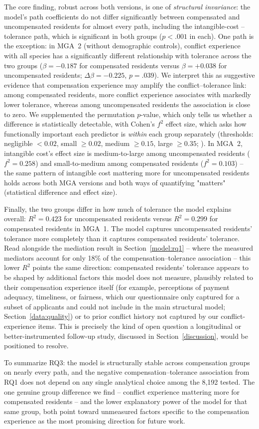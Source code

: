The core finding, robust across both versions, is one of \emph{structural
invariance}: the model's path coefficients do not differ significantly
between compensated and uncompensated residents for almost every path,
including the intangible-cost -- tolerance path, which is significant in both
groups ($p < .001$ in each). One path is the exception: in MGA~2 (without
demographic controls), conflict experience with all species has a
significantly different relationship with tolerance across the two groups
($\beta = -0.187$ for compensated residents versus $\beta = +0.038$ for
uncompensated residents; $\Delta\beta = -0.225$, $p = .039$). We interpret
this as suggestive evidence that compensation experience may amplify the
conflict--tolerance link: among compensated residents, more conflict
experience associates with markedly lower tolerance, whereas among
uncompensated residents the association is close to zero. We supplemented
the permutation $p$-value, which only tells us whether a difference is
statistically detectable, with Cohen's $f^2$ effect size, which asks how
functionally important each predictor is \emph{within} each group
separately (thresholds: negligible $< 0.02$, small $\geq 0.02$, medium
$\geq 0.15$, large $\geq 0.35$; \citealp{Cohen1988}). In MGA~2, intangible
cost's effect size is medium-to-large among uncompensated residents
($f^2 = 0.258$) and small-to-medium among compensated residents
($f^2 = 0.103$) -- the same pattern of intangible cost mattering more for
uncompensated residents holds across both MGA versions and both ways of
quantifying "matters" (statistical difference and effect size).

Finally, the two groups differ in how much of tolerance the model explains
overall: $R^2 = 0.423$ for uncompensated residents versus $R^2 = 0.299$ for
compensated residents in MGA~1. The model captures uncompensated residents'
tolerance more completely than it captures compensated residents' tolerance.
Read alongside the mediation result in Section~\ref{model:rq1} -- where the
measured mediators account for only 18\% of the compensation--tolerance
association -- this lower $R^2$ points the same direction: compensated
residents' tolerance appears to be shaped by additional factors this model
does not measure, plausibly related to their compensation experience itself
(for example, perceptions of payment adequacy, timeliness, or fairness,
which our questionnaire only captured for a subset of applicants and could
not include in the main structural model; Section~\ref{data:quality}) or to
prior conflict history not captured by our conflict-experience items. This
is precisely the kind of open question a longitudinal or better-instrumented
follow-up study, discussed in Section~\ref{discussion}, would be positioned
to resolve.

To summarize RQ3: the model is structurally stable across compensation
groups on nearly every path, and the negative compensation--tolerance
association from RQ1 does not depend on any single analytical choice among
the 8{,}192 tested. The one genuine group difference we find -- conflict
experience mattering more for compensated residents -- and the lower
explanatory power of the model for that same group, both point toward
unmeasured factors specific to the compensation experience as the most
promising direction for future work.

